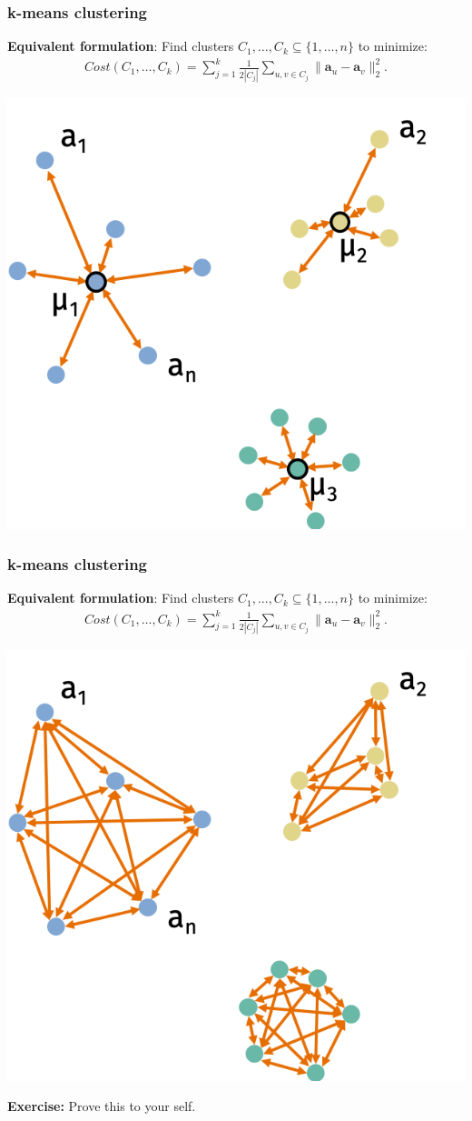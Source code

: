 \documentclass[compress,handout]{beamer}
\newcommand{\bv}[1]{\mathbf{#1}}
\begin{document}
\begin{frame}[t]
	\frametitle{k-means clustering}
	\textbf{Equivalent formulation}: Find clusters $C_1, \ldots, C_k \subseteq \{1, \ldots, n\}$ to minimize:
	\begin{align*}
	Cost(C_1,\ldots, C_k) = \sum_{j=1}^k \frac{1}{2|C_j|}\sum_{u,v\in C_j} \|\bv{a}_u - \bv{a}_v\|_2^2.
	\end{align*}
\vspace{-1em}
	\begin{center}
	\includegraphics[width=.5\textwidth]{kmeans3.png}
	\end{center}
\end{frame}
\begin{frame}[t]
	\frametitle{k-means clustering}
	\textbf{Equivalent formulation}: Find clusters $C_1, \ldots, C_k \subseteq \{1, \ldots, n\}$ to minimize:
	\begin{align*}
		Cost(C_1,\ldots, C_k) = \sum_{j=1}^k \frac{1}{2|C_j|}\sum_{u,v\in C_j} \|\bv{a}_u - \bv{a}_v\|_2^2.
	\end{align*}
\vspace{-1em}
	\begin{center}
		\includegraphics[width=.5\textwidth]{kmeans4.png}
	\end{center}
\textbf{Exercise:} Prove this to your self.
\end{frame}
\end{document}
